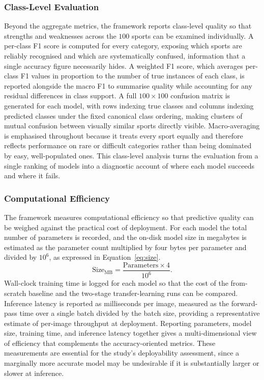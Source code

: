 \subsubsection{Class-Level Evaluation}
\label{subsubsec:method-classlevel}

Beyond the aggregate metrics, the framework reports class-level quality so that strengths and weaknesses across the $100$ sports can be examined individually.
A per-class F1 score is computed for every category, exposing which sports are reliably recognised and which are systematically confused, information that a single accuracy figure necessarily hides.
A weighted F1 score, which averages per-class F1 values in proportion to the number of true instances of each class, is reported alongside the macro F1 to summarise quality while accounting for any residual differences in class support.
A full $100\times100$ confusion matrix is generated for each model, with rows indexing true classes and columns indexing predicted classes under the fixed canonical class ordering, making clusters of mutual confusion between visually similar sports directly visible.
Macro-averaging is emphasised throughout because it treats every sport equally and therefore reflects performance on rare or difficult categories rather than being dominated by easy, well-populated ones.
This class-level analysis turns the evaluation from a single ranking of models into a diagnostic account of where each model succeeds and where it fails.

\subsubsection{Computational Efficiency}
\label{subsubsec:method-efficiency}

The framework measures computational efficiency so that predictive quality can be weighed against the practical cost of deployment.
For each model the total number of parameters is recorded, and the on-disk model size in megabytes is estimated as the parameter count multiplied by four bytes per parameter and divided by $10^{6}$, as expressed in Equation~\eqref{eq:size}.
\begin{equation}
\label{eq:size}
\mathrm{Size}_{\mathrm{MB}} = \frac{\mathrm{Parameters}\times 4}{10^{6}}.
\end{equation}
Wall-clock training time is logged for each model so that the cost of the from-scratch baseline and the two-stage transfer-learning runs can be compared.
Inference latency is reported as milliseconds per image, measured as the forward-pass time over a single batch divided by the batch size, providing a representative estimate of per-image throughput at deployment.
Reporting parameters, model size, training time, and inference latency together gives a multi-dimensional view of efficiency that complements the accuracy-oriented metrics.
These measurements are essential for the study's deployability assessment, since a marginally more accurate model may be undesirable if it is substantially larger or slower at inference.

